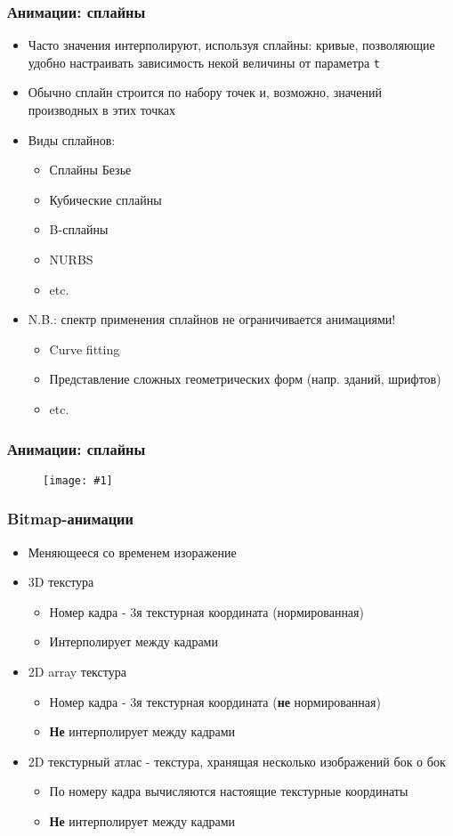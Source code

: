 \documentclass{beamer}
\newcommand{\slideimage}[1]{
  \begin{figure}
    \begin{adjustbox}{width=\textwidth, totalheight=\textheight-2\baselineskip-2\baselineskip,keepaspectratio}
      \texttt{[image: \#1]}
    \end{adjustbox}
  \end{figure}
}
\begin{document}
\begin{frame}[fragile]
\frametitle{Анимации: сплайны}
\begin{itemize}
\item Часто значения интерполируют, используя сплайны: кривые, позволяющие удобно настраивать зависимость некой величины от параметра \verb|t|
\item Обычно сплайн строится по набору точек и, возможно, значений производных в этих точках
\pause
\item Виды сплайнов:
\begin{itemize}
\item Сплайны Безье
\item Кубические сплайны
\item B-сплайны
\item NURBS
\item etc.
\end{itemize}
\pause
\item N.B.: спектр применения сплайнов не ограничивается анимациями!
\begin{itemize}
\item Curve fitting
\item Представление сложных геометрических форм (напр. зданий, шрифтов)
\item etc.
\end{itemize}
\end{itemize}
\end{frame}

\begin{frame}[fragile]
\frametitle{Анимации: сплайны}
\slideimage{spline-editing.png}
\end{frame}

\begin{frame}[fragile]
\frametitle{Bitmap-анимации}
\begin{itemize}
\item Меняющееся со временем изоражение
\pause
\item 3D текстура
\begin{itemize}
\item Номер кадра - 3я текстурная координата (нормированная)
\item Интерполирует между кадрами
\end{itemize}
\pause
\item 2D array текстура
\begin{itemize}
\item Номер кадра - 3я текстурная координата (\textbf{не} нормированная)
\item \textbf{Не} интерполирует между кадрами
\end{itemize}
\pause
\item 2D текстурный атлас - текстура, хранящая несколько изображений бок о бок
\begin{itemize}
\item По номеру кадра вычисляются настоящие текстурные координаты
\item \textbf{Не} интерполирует между кадрами
\end{itemize}
\end{itemize}
\end{frame}
\end{document}

